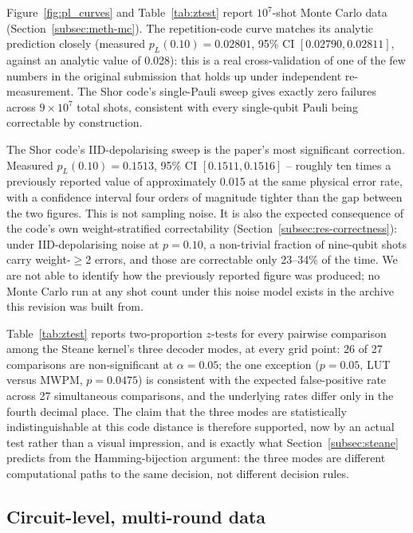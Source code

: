 Figure~\ref{fig:pl_curves} and Table~\ref{tab:ztest} report \(10^7\)-shot Monte Carlo data (Section~\ref{subsec:meth-mc}). The repetition-code curve matches its analytic prediction closely (measured \(p_L(0.10)=0.02801\), 95\% CI \([0.02790,0.02811]\), against an analytic value of 0.028): this is a real cross-validation of one of the few numbers in the original submission that holds up under independent re-measurement. The Shor code's single-Pauli sweep gives exactly zero failures across \(9\times10^7\) total shots, consistent with every single-qubit Pauli being correctable by construction.

The Shor code's IID-depolarising sweep is the paper's most significant correction. Measured \(p_L(0.10) = 0.1513\), 95\% CI \([0.1511, 0.1516]\) -- roughly ten times a previously reported value of approximately 0.015 at the same physical error rate, with a confidence interval four orders of magnitude tighter than the gap between the two figures. This is not sampling noise. It is also the expected consequence of the code's own weight-stratified correctability (Section~\ref{subsec:res-correctness}): under IID-depolarising noise at \(p=0.10\), a non-trivial fraction of nine-qubit shots carry weight-\(\ge\)2 errors, and those are correctable only 23--34\% of the time. We are not able to identify how the previously reported figure was produced; no Monte Carlo run at any shot count under this noise model exists in the archive this revision was built from.

Table~\ref{tab:ztest} reports two-proportion \(z\)-tests for every pairwise comparison among the Steane kernel's three decoder modes, at every grid point: 26 of 27 comparisons are non-significant at \(\alpha=0.05\); the one exception (\(p=0.05\), LUT versus MWPM, \(p=0.0475\)) is consistent with the expected false-positive rate across 27 simultaneous comparisons, and the underlying rates differ only in the fourth decimal place. The claim that the three modes are statistically indistinguishable at this code distance is therefore supported, now by an actual test rather than a visual impression, and is exactly what Section~\ref{subsec:steane} predicts from the Hamming-bijection argument: the three modes are different computational paths to the same decision, not different decision rules.



\subsection{Circuit-level, multi-round data}\label{subsec:res-circuit}

